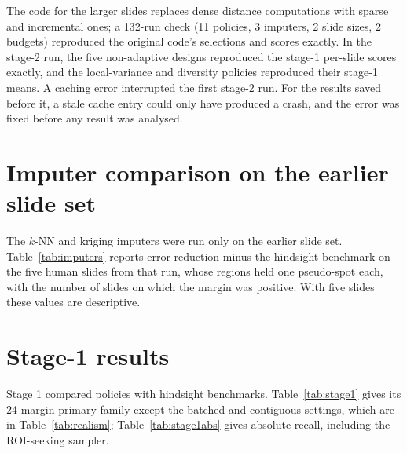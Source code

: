 \documentclass[10pt]{article}
\newcommand{\fittable}[1]{\resizebox{\ifdim\width>\linewidth\linewidth\else\width\fi}{!}{#1}}
\begin{document}
The code for the larger slides replaces dense distance computations with sparse and incremental ones; a 132-run check
(11 policies, 3 imputers, 2 slide sizes, 2 budgets) reproduced the original code's selections and scores exactly. In
the stage-2 run, the five non-adaptive designs reproduced the stage-1 per-slide scores exactly, and the
local-variance and diversity policies reproduced their stage-1 means. A caching error interrupted the first stage-2
run. For the results saved before it, a stale cache entry could only have produced a crash, and the error was fixed
before any result was analysed.

\section{Imputer comparison on the earlier slide set}
\label{app:imputers}

The $k$-NN and kriging imputers were run only on the earlier slide set. Table~\ref{tab:imputers} reports
error-reduction minus the hindsight benchmark on the five human slides from that run, whose regions
held one pseudo-spot each, with the number of slides on which the margin was positive. With five slides these values
are descriptive.

\begin{table}[H]
\centering
\caption{Error-reduction minus the hindsight benchmark (PCC), mean over 5 human Visium HD slides
(positive/total).}
\label{tab:imputers}
\fittable{\small}
\end{table}

\section{Stage-1 results}
\label{app:stage1}

Stage 1 compared policies with hindsight benchmarks. Table~\ref{tab:stage1} gives its 24-margin
primary family except the batched and contiguous settings, which are in Table~\ref{tab:realism};
Table~\ref{tab:stage1abs} gives absolute recall, including the ROI-seeking sampler.

\begin{table}[H]
\centering
\caption{Stage-1 primary margins against hindsight benchmarks: for error-reduction, the best of the five
non-adaptive designs on each slide; for local-variance, the best of the three coverage designs. Unadjusted 95\% CIs
resampling studies; $p_H$ Holm-adjusted over the 24 stage-1 primary margins.}
\label{tab:stage1}
\fittable{}
\end{table}
\end{document}
